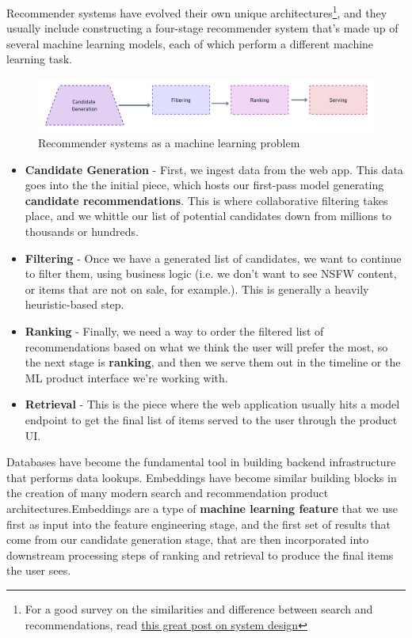 \documentclass[11pt, table]{diazessay} %
\begin{document}
\begin{sloppypar}
Recommender systems have evolved  their own unique architectures\footnote{For a good survey on the similarities and difference between search and recommendations, read \href{https://eugeneyan.com/writing/system-design-for-discovery/}{this great post on system design}}, and they usually include constructing a four-stage recommender system that's made up of several machine learning models, each of which perform a different machine learning task. 

\begin{figure}[H]
\centering
\includegraphics[width=\textwidth]{figures/recsys.png}
\caption{Recommender systems as a machine learning problem}
\end{figure}

\begin{itemize}
  \item \textbf{Candidate Generation} - First, we ingest data from the web app.  This data goes into the the initial piece, which hosts our first-pass model generating \textbf{candidate recommendations}. This is where collaborative filtering takes place, and we whittle our list of potential candidates down from millions to thousands or hundreds. 
  \item \textbf{Filtering} - Once we have a generated list of candidates, we want to continue to filter them, using business logic (i.e. we don't want to see NSFW content, or items that are not on sale, for example.). This is generally a heavily heuristic-based step. 
  \item \textbf{Ranking} - Finally, we need a way to order the filtered list of recommendations based on what we think the user will prefer the most, so the next stage is \textbf{ranking}, and then we serve them out in the timeline or the ML product interface we're working with. 
  \item \textbf{Retrieval} - This is the piece where the web application usually hits a model endpoint to get the final list of items served to the user through the product UI.
\end{itemize}
	
Databases have become the fundamental tool in building backend infrastructure that performs data lookups. Embeddings have become similar building blocks in the creation of many modern search and recommendation product architectures.Embeddings are a type of \textbf{machine learning feature} that we use first as input into the feature engineering stage, and the first set of results that come from our candidate generation stage, that are then incorporated into downstream processing steps of ranking and retrieval to produce the final items the user sees. 


\end{sloppypar}
\end{document}
